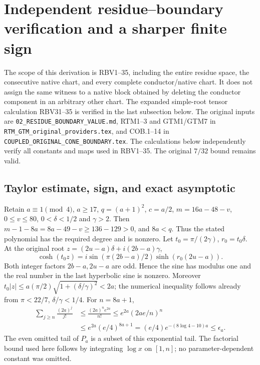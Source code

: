 \begingroup
\section{Independent residue--boundary verification and a sharper finite sign}
\label{sec:RBV-independent}

The scope of this derivation is RBV1--35, including the entire residue
space, the consecutive native chart, and every complete
conductor/native chart.  It does not assign the same witness to a
native block obtained by deleting the conductor component in an
arbitrary other chart. The expanded simple-root tensor calculation
RBV31--35 is verified in the last subsection below.
The original inputs are \texttt{02\_RESIDUE\_BOUNDARY\_VALUE.md},
RTM1--3 and GTM1/GTM7 in \texttt{RTM\_GTM\_original\_providers.tex},
and COB.1--14 in \texttt{COUPLED\_ORIGINAL\_CONE\_BOUNDARY.tex}.
The calculations below independently verify all constants and maps
used in RBV1--35. The original $7/32$ bound remains valid.

\subsection{Taylor estimate, sign, and exact asymptotic}

Retain $a\equiv1\pmod4$, $a\ge17$, $q=(a+1)^2$, $c=a/2$,
$m=16a-48-v$, $0\le v\le80$, $0<\delta<1/2$ and $\gamma>2$.
Then
$m-1-8a=8a-49-v\ge136-129>0$, and $8a<q$.
Thus the stated polynomial has the required degree and is nonzero.
Let $t_0=\pi/(2\gamma)$, $r_0=t_0\delta$.
At the original root $z=(2u-a)\delta+i(2b-a)\gamma$,
\[
 \cosh(t_0z)
 =i\sin(\pi(2b-a)/2)\sinh(r_0(2u-a)).
 \tag{RBR1}
\]
Both integer factors $2b-a,2u-a$ are odd.  Hence the sine has
modulus one and the real number in the last hyperbolic sine is
nonzero.
Moreover $t_0|z|\le a(\pi/2)\sqrt{1+(\delta/\gamma)^2}<2a$;
the numerical inequality follows already from
$\pi<22/7$, $\delta/\gamma<1/4$.
For $n=8a+1$,
\[
\begin{split}
 \sum_{j\ge n}\frac{(2a)^j}{j!}
 &\le\frac{(2a)^n e^{2a}}{n!}
 \le e^{2a}(2ae/n)^n\\
 &\le e^{2a}(e/4)^{8a+1}
 =(e/4)e^{-(8\log4-10)a}
 \le \epsilon_a .
\end{split}                                                    \tag{RBR2}
\]
The even omitted tail of $P_a$ is a subset of this exponential
tail.  The factorial bound used here follows by integrating
$\log x$ on $[1,n]$; no parameter-dependent constant was omitted.

